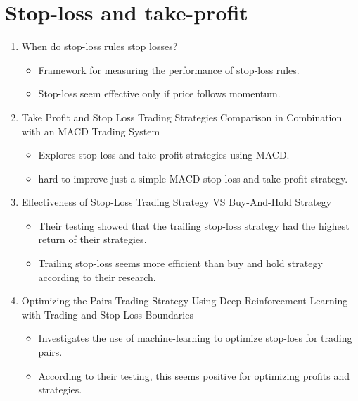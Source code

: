 \section{Stop-loss and take-profit}
    \begin{enumerate}
        \item When do stop-loss rules stop losses?
        \cite{kaminski2014stop}
        \begin{itemize}
            \item Framework for measuring the performance of stop-loss rules.
            \item Stop-loss seem effective only if price follows momentum.
        \end{itemize}

        \item Take Profit and Stop Loss Trading Strategies Comparison in Combination with an MACD Trading System
        \cite{vezeris2018take}
        \begin{itemize}
            \item Explores stop-loss and take-profit strategies using MACD.
            \item hard to improve just a simple MACD stop-loss and take-profit strategy.
        \end{itemize}

        \item Effectiveness of Stop-Loss Trading Strategy VS Buy-And-Hold Strategy
        \cite{teimoori2023effectiveness}
        \begin{itemize}
            \item Their testing showed that the trailing stop-loss strategy had the highest return of their strategies.
            \item Trailing stop-loss seems more efficient than buy and hold strategy according to their research.
        \end{itemize}

        \item Optimizing the Pairs-Trading Strategy Using Deep Reinforcement Learning with Trading and Stop-Loss Boundaries
        \cite{kim2019optimizing}
        \begin{itemize}
            \item Investigates the use of machine-learning to optimize stop-loss for trading pairs.
            \item According to their testing, this seems positive for optimizing profits and strategies.
        \end{itemize}
        
    \end{enumerate}

